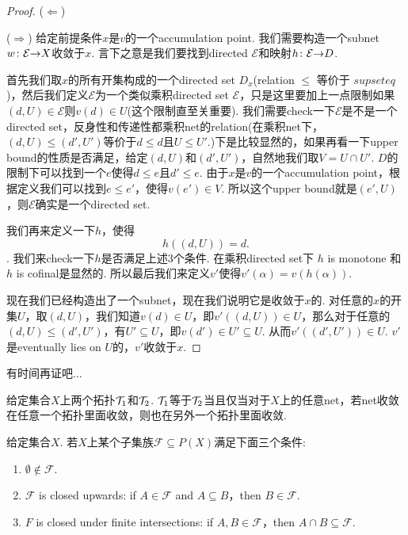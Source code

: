 \begin{proof}
($\Leftarrow$) 

($\Rightarrow$) 给定前提条件$x$是$v$的一个accumulation point. 我们需要构造一个subnet ${w}\colon{\mathcal{E}}{\to}{X}$收敛于$x$. 言下之意是我们要找到directed $\mathcal{E}$和映射${h}\colon{\mathcal{E}}{\to}{D}$.

首先我们取$x$的所有开集构成的一个directed set $D_x$(relation $\leq$ 等价于 $supseteq$)，然后我们定义$\mathcal{E}$为一个类似乘积directed set $\mathcal{E}$，只是这里要加上一点限制如果$(d,U) \in \mathcal{E}$则$v(d) \in U $(这个限制直至关重要). 我们需要check一下$\mathcal{E}$是不是一个directed set，反身性和传递性都乘积net的relation(在乘积net下，$(d,U) \leq (d',U')$等价于$d \leq d$且$U \leq U'$.)下是比较显然的，如果再看一下upper bound的性质是否满足，给定$(d,U)$和$(d',U')$，自然地我们取$V = U \cap U'$. $D$的限制下可以找到一个$e$使得$d \leq e$且$d' \leq e$. 由于$x$是$v$的一个accumulation point，根据定义我们可以找到$e \leq e'$，使得$v(e') \in V$. 所以这个upper bound就是$(e',U)$，则$\mathcal{E}$确实是一个directed set.

我们再来定义一下$h$，使得\[h((d,U)) = d.\]. 我们来check一下$h$是否满足上述3个条件. 在乘积directed set下 $h$ is monotone 和 $h$ is cofinal是显然的. 所以最后我们来定义$v'$使得$v'(\alpha) = v(h(\alpha))$.


现在我们已经构造出了一个subnet，现在我们说明它是收敛于$x$的. 对任意的$x$的开集$U$，取$(d,U)$，我们知道$v(d) \in U$，即$v'((d,U)) \in U$，那么对于任意的$(d,U) \leq (d',U')$，有$U' \subseteq U$，即$v(d') \in U' \subseteq U$. 从而$v'((d',U')) \in U$. $v'$是eventually lies on $U$的，$v'$收敛于$x$.
\end{proof}


有时间再证吧...
\begin{theorem}
给定集合$X$上两个拓扑$\mathcal{T}_1$和$\mathcal{T}_2$. $\mathcal{T}_1$等于$\mathcal{T}_2$当且仅当对于$X$上的任意net，若net收敛在任意一个拓扑里面收敛，则也在另外一个拓扑里面收敛.
\end{theorem}


\begin{definition}
给定集合$X$. 若$X$上某个子集族$\mathcal{F} \subseteq P(X)$满足下面三个条件:
\begin{enumerate}
 \item $\emptyset \notin \mathcal{F}.$
 \item $\mathcal{F}$ is closed upwards: if $A \in \mathcal{F}$ and $A \subseteq B$，then $B \in \mathcal{F}.$
 \item $F$ is closed under finite intersections: if $A,B \in \mathcal{F}$，then $A \cap B \subseteq \mathcal{F}.$
\end{enumerate}
\end{definition}







